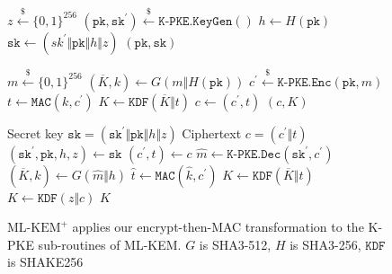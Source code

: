\documentclass[runningheads]{llncs}
\newcommand{\keygen}{\texttt{KeyGen}}
\newcommand{\encrypt}{\texttt{Enc}}
\newcommand{\decrypt}{\texttt{Dec}}
\newcommand{\encap}{\texttt{Encap}}
\newcommand{\decap}{\texttt{Decap}}
\newcommand{\mac}{\texttt{MAC}}
\newcommand{\pk}{\texttt{pk}}
\newcommand{\sk}{\texttt{sk}}
\newcommand{\leftsample}{\stackrel{\$}{\leftarrow}}
\def\mlkemplus{\text{ML-KEM}^+}
\begin{document}
\begin{figure}[h]
    \centering

    \begin{minipage}[t]{0.5\textwidth}
        \begin{algorithm}[H]
            \caption*{$\texttt{ML-KEM}^\texttt{+}\texttt{.}\keygen\texttt{()}$}
            \begin{algorithmic}[1]
                \State $z \leftsample \{0,1\}^{256}$
                \State $(\pk, \sk^\prime) \leftsample \texttt{K-PKE}.\keygen()$
                \State $h \leftarrow H(\pk)$
                \State $\sk \leftarrow (sk^\prime \Vert \pk \Vert h \Vert z)$
                \State \Return $(\pk, \sk)$
            \end{algorithmic}
        \end{algorithm}\vspace{-0.5cm}
        \begin{algorithm}[H]
            \caption*{$\texttt{ML-KEM}^\texttt{+}\texttt{.}\encap\texttt{(\pk)}$}
            \begin{algorithmic}[1]
                \State $m \leftsample \{0,1\}^{256}$
                \State $(\overline{K}, k) \leftarrow G(m \Vert H(\pk))$
                \State $c^\prime \leftsample \texttt{K-PKE}.\encrypt(\pk, m)$
                \State $t \leftarrow \mac(k, c^\prime)$
                \State $K \leftarrow \texttt{KDF}(\overline{K} \Vert t)$
                \State $c \leftarrow (c^\prime, t)$
                \State \Return $(c, K)$
            \end{algorithmic}
        \end{algorithm}
    \end{minipage}\hfill
    \begin{minipage}[t]{0.49\textwidth}
        \begin{algorithm}[H]
            \caption*{$\texttt{ML-KEM}^\texttt{+}\texttt{.}\decap\texttt{(\sk, c)}$}
            \begin{algorithmic}[1]
                \Require Secret key $\sk = (\sk^\prime \Vert \pk \Vert h \Vert z)$
                \Require Ciphertext $c = (c^\prime \Vert t)$
                \State $(\sk^\prime, \pk, h, z) \leftarrow \sk$
                \State $(c^\prime, t) \leftarrow c$
                \State $\hat{m} \leftarrow \texttt{K-PKE}.\decrypt(\sk^\prime, c^\prime)$
                \State $(\overline{K}, \hat{k}) \leftarrow G(\hat{m} \Vert h)$
                \State $\hat{t} \leftarrow \mac(\hat{k}, c^\prime)$
                    \State $K \leftarrow \texttt{KDF}(\overline{K} \Vert t)$
                \Else
                    \State $K \leftarrow \texttt{KDF}(z \Vert c)$
                \EndIf
                \State \Return $K$
            \end{algorithmic}
        \end{algorithm}
    \end{minipage}

    \caption{$\mlkemplus$ applies our encrypt-then-MAC transformation to the K-PKE sub-routines of ML-KEM. $G$ is SHA3-512, $H$ is SHA3-256, $\texttt{KDF}$ is SHAKE256}\label{fig:ml-kem-plus-routines}
\end{figure}
\end{document}
